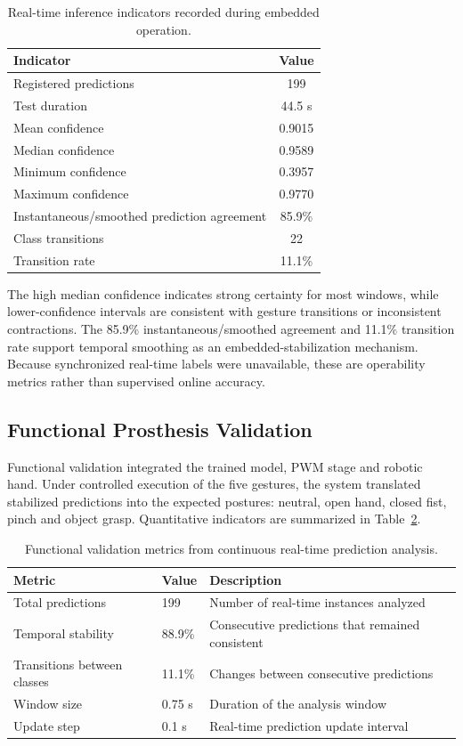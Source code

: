 \documentclass[technologies,article,submit,pdftex,moreauthors]{Definitions/mdpi}
\begin{document}
\begin{table}[H]
\centering
\caption{Real-time inference indicators recorded during embedded operation.\label{tab:realtime}}
\begin{tabular}{lc}
\toprule
\textbf{Indicator} & \textbf{Value} \\
\midrule
Registered predictions & 199 \\
Test duration & 44.5 s \\
Mean confidence & 0.9015 \\
Median confidence & 0.9589 \\
Minimum confidence & 0.3957 \\
Maximum confidence & 0.9770 \\
Instantaneous/smoothed prediction agreement & 85.9\% \\
Class transitions & 22 \\
Transition rate & 11.1\% \\
\bottomrule
\end{tabular}
\end{table}

The high median confidence indicates strong certainty for most windows, while lower-confidence intervals are consistent with gesture transitions or inconsistent contractions. The 85.9\% instantaneous/smoothed agreement and 11.1\% transition rate support temporal smoothing as an embedded-stabilization mechanism. Because synchronized real-time labels were unavailable, these are operability metrics rather than supervised online accuracy.

\subsection{Functional Prosthesis Validation}

Functional validation integrated the trained model, PWM stage and robotic hand. Under controlled execution of the five gestures, the system translated stabilized predictions into the expected postures: neutral, open hand, closed fist, pinch and object grasp. Quantitative indicators are summarized in Table~\ref{tab:functional}.

\begin{table}[H]
\centering
\caption{Functional validation metrics from continuous real-time prediction analysis.\label{tab:functional}}
\begin{tabularx}{\textwidth}{llX}
\toprule
\textbf{Metric} & \textbf{Value} & \textbf{Description} \\
\midrule
Total predictions & 199 & Number of real-time instances analyzed \\
Temporal stability & 88.9\% & Consecutive predictions that remained consistent \\
Transitions between classes & 11.1\% & Changes between consecutive predictions \\
Window size & 0.75 s & Duration of the analysis window \\
Update step & 0.1 s & Real-time prediction update interval \\
\bottomrule
\end{tabularx}
\end{table}
\end{document}
